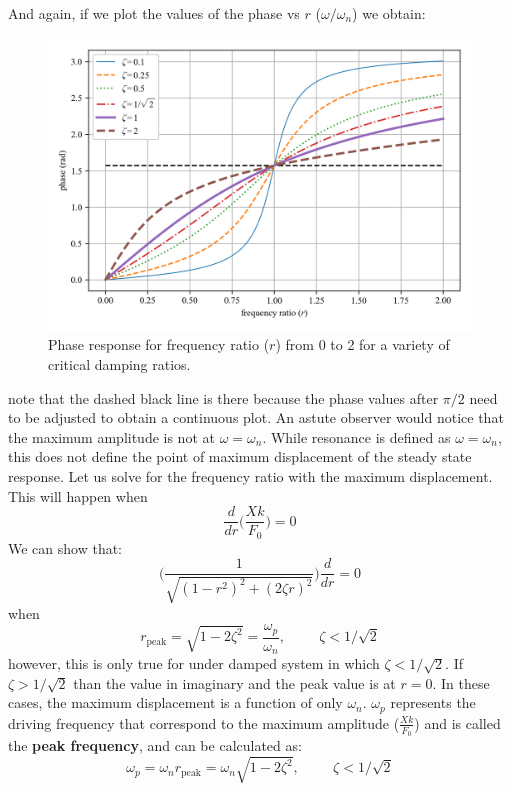 \documentclass[12pt,letter]{article}
\numberwithin{ex}{section} %
\numberwithin{re}{section} %
\begin{document}
			\noindent And again, if we plot the values of the phase vs $r$ ($\omega/\omega_n$) we obtain:
			\begin{figure}[H]
				\centering
				\includegraphics[]{../Figures/underdamped_frequency_response_phase.png}
				\caption{Phase response for frequency ratio ($r$) from 0 to 2 for a variety of critical damping ratios.}
			\end{figure}				
			\noindent note that the dashed black line is there because the phase values after $\pi/2$ need to be adjusted to obtain a continuous plot. An astute observer would notice that the maximum amplitude is not at $\omega = \omega_n$. While resonance is defined as $\omega = \omega_n$, this does not define the point of maximum displacement of the steady state response. Let us solve for the frequency ratio with the maximum displacement. This will happen when
			\begin{equation}
				\frac{d}{dr}\Bigg(\frac{Xk}{F_0} \Bigg)= 0
			\end{equation}				
			We can show that:
			\begin{equation}
			\Bigg(\frac{1}{\sqrt{(1-r^2)^2+(2\zeta r)^2}}\Bigg)	\frac{d}{dr} =0
			\end{equation}	
			when 
			\begin{equation}
			r_{\text{peak}} = \sqrt{1-2 \zeta^2}= \frac{\omega_p}{\omega_n}, \hspace{1cm} \zeta<1/\sqrt{2} 
			\end{equation}				
			however, this is only true for under damped system in which $\zeta<1/\sqrt{2}$. If $\zeta>1/\sqrt{2}$ than the value in imaginary and the peak value is at $r=0$. In these cases, the maximum displacement is a function of only $\omega_n$. $\omega_p$ represents the driving frequency that correspond to the maximum amplitude ($\frac{Xk}{F_0}$) and is called the \textbf{peak frequency}, and can be calculated as:
			\begin{equation}
			\omega_p = \omega_n r_{\text{peak}} = \omega_n \sqrt{1-2 \zeta^2}, \hspace{1cm} \zeta<1/\sqrt{2} 
			\end{equation}				
			
\end{document}
